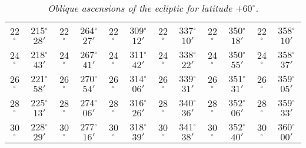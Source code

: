 \begin{table}
{\begin{tabular}{cc|cc|cc|cc|cc|cc}
22$^\circ$ & 215$^\circ$$28'$ & 22$^\circ$ & 264$^\circ$$27'$ & 22$^\circ$ & 309$^\circ$$12'$ & 22$^\circ$ & 337$^\circ$$10'$ &  22$^\circ$ & 350$^\circ$$18'$ & 22$^\circ$ & 358$^\circ$$10'$\\
24$^\circ$ & 218$^\circ$$43'$ & 24$^\circ$ & 267$^\circ$$41'$ & 24$^\circ$ & 311$^\circ$$42'$ & 24$^\circ$ & 338$^\circ$$22'$ &  24$^\circ$ & 350$^\circ$$55'$ & 24$^\circ$ & 358$^\circ$$37'$\\
26$^\circ$ & 221$^\circ$$58'$ & 26$^\circ$ & 270$^\circ$$54'$ & 26$^\circ$ & 314$^\circ$$06'$ & 26$^\circ$ & 339$^\circ$$31'$ &  26$^\circ$ & 351$^\circ$$31'$ & 26$^\circ$ & 359$^\circ$$05'$\\
28$^\circ$ & 225$^\circ$$13'$ & 28$^\circ$ & 274$^\circ$$06'$ & 28$^\circ$ & 316$^\circ$$26'$ & 28$^\circ$ & 340$^\circ$$36'$ &  28$^\circ$ & 352$^\circ$$06'$ & 28$^\circ$ & 359$^\circ$$33'$\\
30$^\circ$ & 228$^\circ$$29'$ & 30$^\circ$ & 277$^\circ$$16'$ & 30$^\circ$ & 318$^\circ$$39'$ & 30$^\circ$ & 341$^\circ$$38'$ &  30$^\circ$ & 352$^\circ$$40'$ & 30$^\circ$ & 360$^\circ$$00'$\\
\end{tabular}}
\caption{\em Oblique ascensions of the ecliptic for latitude $+60^\circ$.}\label{trr}
\end{table}

